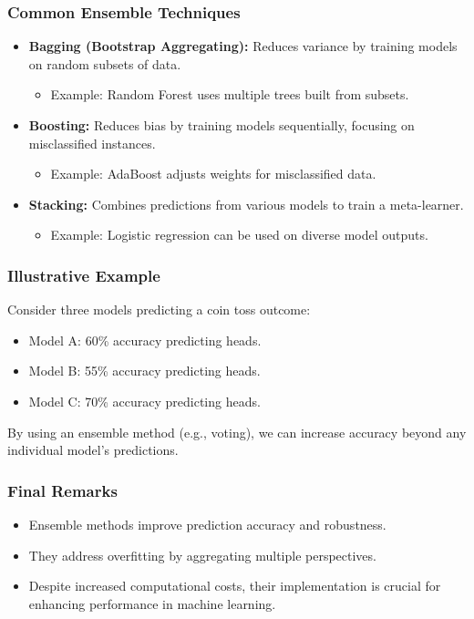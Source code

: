 \documentclass[aspectratio=169]{beamer}
\begin{document}
\begin{frame}[fragile]
    \frametitle{Common Ensemble Techniques}
    \begin{itemize}
        \item \textbf{Bagging (Bootstrap Aggregating):} Reduces variance by training models on random subsets of data.
        \begin{itemize}
            \item Example: Random Forest uses multiple trees built from subsets.
        \end{itemize}
        
        \item \textbf{Boosting:} Reduces bias by training models sequentially, focusing on misclassified instances.
        \begin{itemize}
            \item Example: AdaBoost adjusts weights for misclassified data.
        \end{itemize}
        
        \item \textbf{Stacking:} Combines predictions from various models to train a meta-learner.
        \begin{itemize}
            \item Example: Logistic regression can be used on diverse model outputs.
        \end{itemize}
    \end{itemize}
\end{frame}

\begin{frame}[fragile]
    \frametitle{Illustrative Example}
    Consider three models predicting a coin toss outcome:
    \begin{itemize}
        \item Model A: 60\% accuracy predicting heads.
        \item Model B: 55\% accuracy predicting heads.
        \item Model C: 70\% accuracy predicting heads.
    \end{itemize}
    By using an ensemble method (e.g., voting), we can increase accuracy beyond any individual model's predictions.
\end{frame}

\begin{frame}[fragile]
    \frametitle{Final Remarks}
    \begin{itemize}
        \item Ensemble methods improve prediction accuracy and robustness.
        \item They address overfitting by aggregating multiple perspectives.
        \item Despite increased computational costs, their implementation is crucial for enhancing performance in machine learning.
    \end{itemize}
\end{frame}
\end{document}
